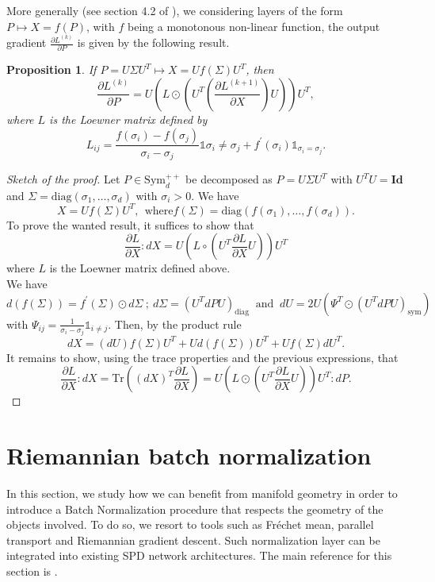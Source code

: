 \documentclass[10pt,a4paper]{book}
\theoremstyle{definition}
\theoremstyle{plain}
\newtheorem{prop}{Proposition}[section]
\theoremstyle{remark}
\newcommand{\Id}{\mathrm{\textbf{Id}}}
\begin{document}
More generally (see section 4.2 of \cite{brooks2019riemannian}), we considering layers of the form $P\mapsto X=f(P)$, with $f$ being a monotonous non-linear function, the output gradient $\frac{\partial L^{(k)}}{\partial P}$ is given by the following result.
\begin{prop} \label{prop.eig.func}
If $P=U\Sigma U^T \mapsto X=Uf(\Sigma) U^T$, then
$$\frac{\partial L^{(k)}}{\partial P}= U\left( L \odot (U^T\left(\frac{\partial L^{(k+1)}}{\partial X}\right) U )\right)U^T,$$
where $L$ is the Loewner matrix defined by
$$L_{ij}=\frac{f(\sigma_i)-f(\sigma_j)}{\sigma_i-\sigma_j}\mathds{1}{\sigma_i\neq \sigma_j}+f^{\prime}(\sigma_i)\mathds{1}_{\sigma_i=\sigma_j}.$$
\end{prop}
\begin{proof}[Sketch of the proof]
Let $P\in \text{Sym}_{d}^{++}$ be decomposed as $P=U\Sigma U^T$ with $U^T U =\Id$ and $\Sigma=\text{diag}(\sigma_1,\dots, \sigma_d)$ with $\sigma_i>0$. We have
$$X=Uf(\Sigma)U^{T},~~\text{where} f(\Sigma)=\text{diag}(f(\sigma_1),\dots, f(\sigma_d)).$$
To prove the wanted result, it suffices to show that
$$\frac{\partial L}{\partial X}:dX=U\left(L\circ (U^T\frac{\partial L}{\partial X} U)\right) U^T$$
where $L$ is the Loewner matrix defined above.
\\
We have
$$d(f(\Sigma))=f^{\prime}(\Sigma)\odot d\Sigma~;~d\Sigma=(U^TdP U)_{\text{diag}}~\text{ and }~dU=2U\left(\Psi^{T}\odot (U^T dP U)_{\text{sym}}\right)$$
with $\Psi_{ij}=\frac{1}{\sigma_i-\sigma_j}\mathds{1}_{i\neq j}$. 
Then, by the product rule
$$dX=(dU)f(\Sigma) U^T+Ud(f(\Sigma))U^T+Uf(\Sigma)dU^{T}.$$
It remains to show, using the trace properties and the previous expressions, that
$$\frac{\partial L}{\partial X}:dX=\text{Tr}\left((dX)^T\frac{\partial L}{\partial X}\right) = U\left(L\odot (U^T\frac{\partial L}{\partial X}U)\right)U^T : dP.$$
\end{proof}

\section{Riemannian batch normalization}

In this section, we study how we can benefit from manifold geometry in order to introduce a Batch Normalization procedure that respects the geometry of the objects involved. 
To do so, we resort to tools such as Fréchet mean, parallel transport and Riemannian gradient descent. 
Such normalization layer can be integrated into existing SPD network architectures. 
The main reference for this section is \cite{brooks2019riemannian}.
\end{document}

